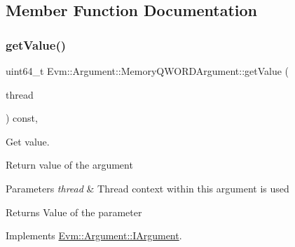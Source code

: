 \subsection{Member Function Documentation}
\mbox{\label{struct_evm_1_1_argument_1_1_memory_q_w_o_r_d_argument_a07ee2f720366e41d8509f3c5aef8a46a}} 
\subsubsection{\texorpdfstring{get\+Value()}{getValue()}}
{\footnotesize\ttfamily uint64\+\_\+t Evm\+::\+Argument\+::\+Memory\+Q\+W\+O\+R\+D\+Argument\+::get\+Value (\begin{DoxyParamCaption}\item[{\mbox{\hyperlink{struct_evm_1_1_thread_context}{Thread\+Context}} \&}]{thread }\end{DoxyParamCaption}) const\hspace{0.3cm}{\ttfamily [override]}, {\ttfamily [virtual]}}



Get value. 

Return value of the argument 
\begin{DoxyParams}{Parameters}
{\em thread} & Thread context within this argument is used \\
\hline
\end{DoxyParams}
\begin{DoxyReturn}{Returns}
Value of the parameter 
\end{DoxyReturn}


Implements \mbox{\hyperlink{struct_evm_1_1_argument_1_1_i_argument_af01db10f34498344831877847c2fc038}{Evm\+::\+Argument\+::\+I\+Argument}}.

\mbox{\label{struct_evm_1_1_argument_1_1_memory_q_w_o_r_d_argument_adb47000f058eca32e797c63857b4a558}} 

